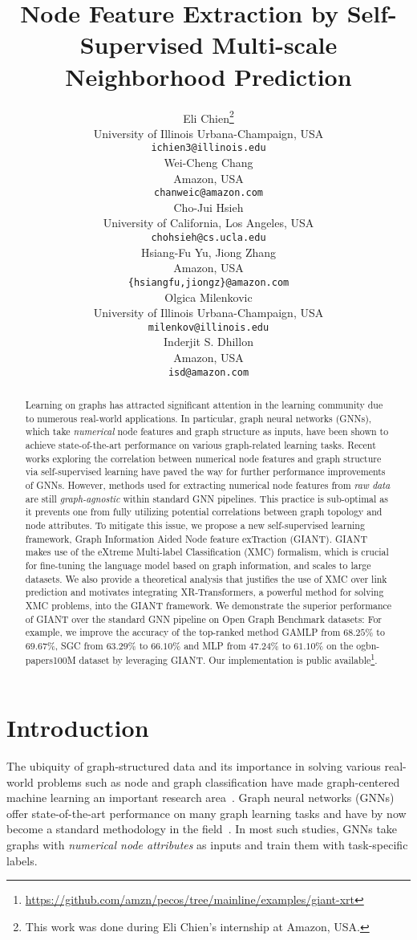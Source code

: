 \documentclass{article} %
\title{Node Feature Extraction by Self-Supervised Multi-scale Neighborhood Prediction}
\author{Eli Chien\thanks{This work was done during Eli Chien’s internship at Amazon, USA.} \\
University of Illinois Urbana-Champaign, USA\\
\texttt{ichien3@illinois.edu} \\
\And
Wei-Cheng Chang \\
Amazon, USA \\
\texttt{chanweic@amazon.com} \\
\AND
Cho-Jui Hsieh \\
University of California, Los Angeles, USA\\
\texttt{chohsieh@cs.ucla.edu} \\
\And
Hsiang-Fu Yu,  Jiong Zhang \\
Amazon, USA \\
\texttt{\{hsiangfu,jiongz\}@amazon.com} \\
\AND
Olgica Milenkovic\\
University of Illinois Urbana-Champaign, USA\\
\texttt{milenkov@illinois.edu}\\
\And
Inderjit S. Dhillon\\
Amazon, USA \\
\texttt{isd@amazon.com} \\
}
\begin{document}
\maketitle

\begin{abstract}
Learning on graphs has attracted significant attention in the learning community due to numerous real-world applications. In particular, graph neural networks (GNNs), which take \emph{numerical} node features and graph structure as inputs, have been shown to achieve state-of-the-art performance on various graph-related learning tasks. Recent works exploring the correlation between numerical node features and graph structure via self-supervised learning have paved the way for further performance improvements of GNNs. However, methods used for extracting numerical node features from \emph{raw data} are still \emph{graph-agnostic} within standard GNN pipelines. This practice is sub-optimal as it prevents one from fully utilizing potential correlations between graph topology and node attributes. To mitigate this issue, we propose a new self-supervised learning framework, Graph Information Aided Node feature exTraction (GIANT). GIANT makes use of the eXtreme Multi-label Classification (XMC) formalism, which is crucial for fine-tuning the language model based on graph information, and scales to large datasets. We also provide a theoretical analysis that justifies the use of XMC over link prediction and motivates integrating XR-Transformers, a powerful method for solving XMC problems, into the GIANT framework. We demonstrate the superior performance of GIANT over the standard GNN pipeline on Open Graph Benchmark datasets: For example, we improve the accuracy of the top-ranked method GAMLP from $68.25\%$ to $69.67\%$, SGC from $63.29\%$ to $66.10\%$ and MLP from $47.24\%$ to $61.10\%$ on the ogbn-papers100M dataset by leveraging GIANT. Our implementation is public available\footnote{\url{https://github.com/amzn/pecos/tree/mainline/examples/giant-xrt}}. 
\end{abstract}

\vspace{-0.5cm}
\section{Introduction}
The ubiquity of graph-structured data and its importance in solving various real-world problems such as node and graph classification have made graph-centered machine learning an important research area~\citep{lu2011link,shervashidze2011weisfeiler,zhu2005semi}. Graph neural networks (GNNs) offer state-of-the-art performance on many graph learning tasks and have by now become a standard methodology in the field~\citep{kipf2017semi,hamilton2017inductive,velickovic2018graph,chien2020adaptive}. In most such studies, GNNs take graphs with \emph{numerical node attributes} as inputs and train them with task-specific labels. 
\end{document}
